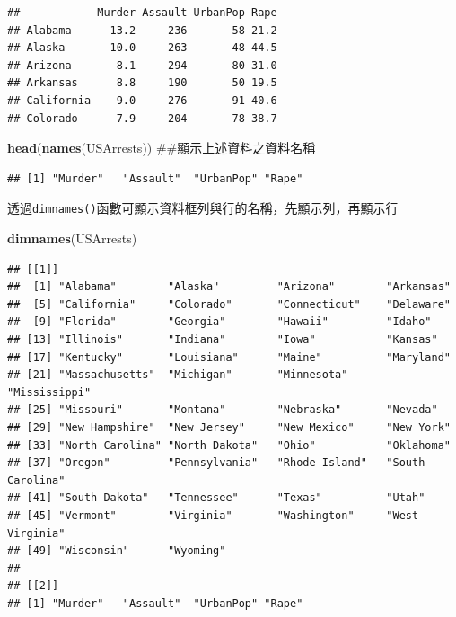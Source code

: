 \documentclass[]{book}
\newenvironment{Shaded}{\begin{snugshade}}{\end{snugshade}}
\newcommand{\KeywordTok}[1]{\textcolor[rgb]{0.13,0.29,0.53}{\textbf{{#1}}}}
\newcommand{\NormalTok}[1]{{#1}}
\theoremstyle{definition}
\theoremstyle{definition}
\theoremstyle{remark}
\begin{document}
\begin{verbatim}
##            Murder Assault UrbanPop Rape
## Alabama      13.2     236       58 21.2
## Alaska       10.0     263       48 44.5
## Arizona       8.1     294       80 31.0
## Arkansas      8.8     190       50 19.5
## California    9.0     276       91 40.6
## Colorado      7.9     204       78 38.7
\end{verbatim}

\begin{Shaded}
\begin{Highlighting}[]
\KeywordTok{head}\NormalTok{(}\KeywordTok{names}\NormalTok{(USArrests)) ##顯示上述資料之資料名稱}
\end{Highlighting}
\end{Shaded}

\begin{verbatim}
## [1] "Murder"   "Assault"  "UrbanPop" "Rape"
\end{verbatim}

透過\texttt{dimnames()}函數可顯示資料框列與行的名稱，先顯示列，再顯示行

\begin{Shaded}
\begin{Highlighting}[]
\KeywordTok{dimnames}\NormalTok{(USArrests) }
\end{Highlighting}
\end{Shaded}

\begin{verbatim}
## [[1]]
##  [1] "Alabama"        "Alaska"         "Arizona"        "Arkansas"      
##  [5] "California"     "Colorado"       "Connecticut"    "Delaware"      
##  [9] "Florida"        "Georgia"        "Hawaii"         "Idaho"         
## [13] "Illinois"       "Indiana"        "Iowa"           "Kansas"        
## [17] "Kentucky"       "Louisiana"      "Maine"          "Maryland"      
## [21] "Massachusetts"  "Michigan"       "Minnesota"      "Mississippi"   
## [25] "Missouri"       "Montana"        "Nebraska"       "Nevada"        
## [29] "New Hampshire"  "New Jersey"     "New Mexico"     "New York"      
## [33] "North Carolina" "North Dakota"   "Ohio"           "Oklahoma"      
## [37] "Oregon"         "Pennsylvania"   "Rhode Island"   "South Carolina"
## [41] "South Dakota"   "Tennessee"      "Texas"          "Utah"          
## [45] "Vermont"        "Virginia"       "Washington"     "West Virginia" 
## [49] "Wisconsin"      "Wyoming"       
## 
## [[2]]
## [1] "Murder"   "Assault"  "UrbanPop" "Rape"
\end{verbatim}
\end{document}
